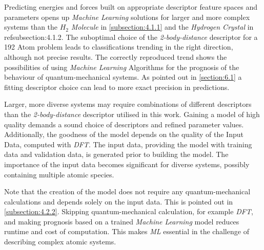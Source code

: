 Predicting energies and forces built on appropriate descriptor feature spaces and parameters opens up \textit{Machine Learning} solutions for larger and more complex systems than the $H_2$ \textit{Molecule} in \ref{subsection:4.1.1} and the  \textit{Hydrogen Crystal} in ref{subsection:4.1.2}. The suboptimal choice of the \textit{2-body-distance} descriptor for a 192 Atom problem leads to classifications trending in the right direction, although not precise results. The correctly reproduced trend shows the possibilities of using \textit{Machine Learning} Algorithms for the prognosis of the behaviour of quantum-mechanical systems. As pointed out in \ref{section:6.1} a fitting descriptor choice can lead to more exact precision in predictions. 

Larger, more diverse systems may require combinations of different descriptors than the \textit{2-body-distance} descriptor utilised in this work. Gaining a model of high quality demands a sound choice of descriptors and refined parameter values. Additionally, the goodness of the model depends on the quality of the Input Data, computed with \textit{DFT}. The input data, providing the model with training data and validation data, is generated prior to building the model.  The importance of the input data becomes significant for diverse systems, possibly containing multiple atomic species.  

Note that the creation of the model does not require any quantum-mechanical calculations and depends solely on the input data. This is pointed out in \ref{subsection:4.2.2}. Skipping quantum-mechanical calculation, for example \textit{DFT}, and making prognosis based on a trained \textit{Machine Learning} model reduces runtime and cost of computation. This makes \textit{ML} essential in the challenge of describing complex atomic systems. 



